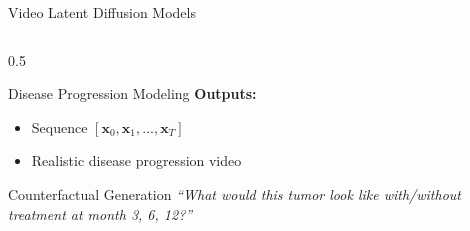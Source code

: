 \documentclass[aspectratio=169]{beamer}
\begin{document}
\begin{frame}{Video Latent Diffusion Models}
\begin{columns}
\begin{column}{0.5\textwidth}
\begin{block}{Disease Progression Modeling}
                \vspace{0.5em}
                \textbf{Outputs:}
                \begin{itemize}
                    \item Sequence $[\mathbf{x}_0, \mathbf{x}_1, ..., \mathbf{x}_T]$
                    \item Realistic disease progression video
                \end{itemize}
            \end{block}
            
            \begin{alertblock}{Counterfactual Generation}
                \textit{``What would this tumor look like with/without treatment at month 3, 6, 12?''}
            \end{alertblock}
        \end{column}
    \end{columns}
\end{frame}
\end{document}
